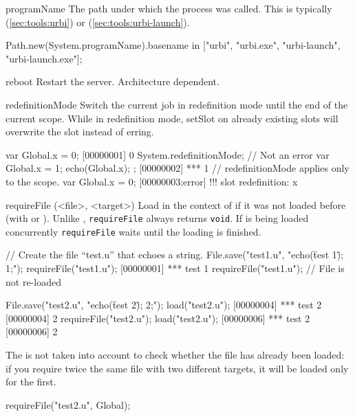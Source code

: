 \begin{urbiscriptapi}
\item[programName] The path under which the \urbi process was called.
  This is typically  (\autoref{sec:tools:urbi}) or
   (\autoref{sec:tools:urbi-launch}).
\begin{urbiassert}
Path.new(System.programName).basename
  in ["urbi", "urbi.exe", "urbi-launch", "urbi-launch.exe"];
\end{urbiassert}


\item[reboot] Restart the \urbi server.  Architecture dependent.


\item[redefinitionMode] Switch the current job in redefinition mode
  until the end of the current scope.  While in redefinition mode,
  setSlot on already existing slots will overwrite the slot instead of
  erring.

\begin{urbiscript}
var Global.x = 0;
[00000001] 0
{
  System.redefinitionMode;
  // Not an error
  var Global.x = 1;
  echo(Global.x);
};
[00000002] *** 1
// redefinitionMode applies only to the scope.
var Global.x = 0;
[00000003:error] !!! slot redefinition: x
\end{urbiscript}


\item[requireFile](<file>, <target>)%
  Load  in the context of  if it was not loaded before
  (with  or ). Unlike ,
  \lstinline{requireFile} always returns \lstinline|void|. If  is
  being loaded concurrently \lstinline{requireFile} waits until the loading
  is finished.

\begin{urbiscript}
// Create the file ``test.u'' that echoes a string.
File.save("test1.u", "echo(\"test 1\"); 1;");
requireFile("test1.u");
[00000001] *** test 1
requireFile("test1.u");
// File is not re-loaded

File.save("test2.u", "echo(\"test 2\"); 2;");
load("test2.u");
[00000004] *** test 2
[00000004] 2
requireFile("test2.u");
load("test2.u");
[00000006] *** test 2
[00000006] 2
\end{urbiscript}

  The  is not taken into account to check whether the file has
  already been loaded: if you require twice the same file with two different
  targets, it will be loaded only for the first.

\begin{urbiscript}
requireFile("test2.u", Global);
\end{urbiscript}



\end{urbiscriptapi}
